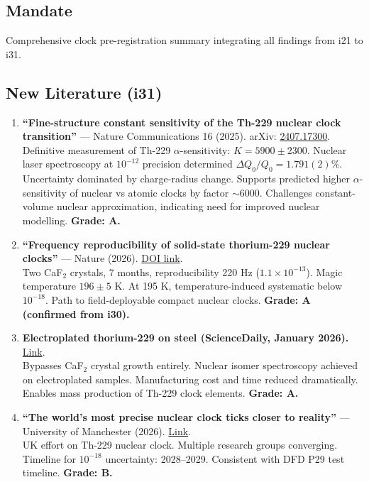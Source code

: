 \documentclass[11pt,a4paper]{article}
\begin{document}
\subsection{Mandate}
Comprehensive clock pre-registration summary integrating all findings from i21 to i31.

\subsection{New Literature (i31)}

\begin{enumerate}
\item \textbf{``Fine-structure constant sensitivity of the Th-229 nuclear clock transition''} --- Nature Communications 16 (2025). arXiv: \href{https://arxiv.org/abs/2407.17300}{2407.17300}.\\
Definitive measurement of Th-229 $\alpha$-sensitivity: $K = 5900 \pm 2300$. Nuclear laser spectroscopy at $10^{-12}$ precision determined $\Delta Q_0/Q_0 = 1.791(2)\%$. Uncertainty dominated by charge-radius change. Supports predicted higher $\alpha$-sensitivity of nuclear vs atomic clocks by factor $\sim 6000$. Challenges constant-volume nuclear approximation, indicating need for improved nuclear modelling. \textbf{Grade: A.}

\item \textbf{``Frequency reproducibility of solid-state thorium-229 nuclear clocks''} --- Nature (2026). \href{https://www.nature.com/articles/s41586-025-09999-5}{DOI link}.\\
Two CaF$_2$ crystals, 7 months, reproducibility 220 Hz ($1.1 \times 10^{-13}$). Magic temperature $196 \pm 5$ K. At 195 K, temperature-induced systematic below $10^{-18}$. Path to field-deployable compact nuclear clocks. \textbf{Grade: A (confirmed from i30).}

\item \textbf{Electroplated thorium-229 on steel (ScienceDaily, January 2026).} \href{https://www.sciencedaily.com/releases/2026/01/260107225542.htm}{Link}.\\
Bypasses CaF$_2$ crystal growth entirely. Nuclear isomer spectroscopy achieved on electroplated samples. Manufacturing cost and time reduced dramatically. Enables mass production of Th-229 clock elements. \textbf{Grade: A.}

\item \textbf{``The world's most precise nuclear clock ticks closer to reality''} --- University of Manchester (2026). \href{https://www.manchester.ac.uk/about/news/the-worlds-most-precise-nuclear-clock-ticks-closer-to-reality/}{Link}.\\
UK effort on Th-229 nuclear clock. Multiple research groups converging. Timeline for $10^{-18}$ uncertainty: 2028--2029. Consistent with DFD P29 test timeline. \textbf{Grade: B.}
\end{enumerate}
\end{document}
